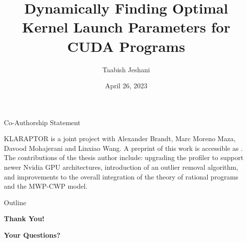 \documentclass[10pt]{beamer}
\title{\textbf{\Large{{Dynamically Finding Optimal Kernel Launch Parameters for CUDA Programs}}}}
\subtitle{}
\author[Jeshani]{
	{Taabish {Jeshani}}
}
\institute{
	\scriptsize
	{		{ORCCA, University of Western Ontario, Canada}\\
	}
}
\date[]
{
	\footnotesize
	April 26, 2023
}
\begin{document}

\begin{frame}
	\titlepage
\end{frame}

\begin{frame}{Co-Authorship Statement}
	\begin{block}{}
        KLARAPTOR is a joint project with Alexander Brandt, Marc Moreno Maza, Davood Mohajerani 
        and Linxiao Wang. A preprint of this work is accessible as \cite{DBLP:journals/corr/abs-1911-02373}. 
        The contributions of the thesis author include: upgrading the profiler to support newer Nvidia GPU architectures, 
        introduction of an outlier removal algorithm, and improvements to the overall integration of the 
        theory of rational programs and the MWP-CWP model.
	\end{block}
\end{frame}
\begin{frame}{Outline}
	\tableofcontents
\end{frame}







\setcounter{finalframe}{\value{framenumber}}


\begin{frame}
\begin{center}
	{\huge{\textbf{Thank You!}}}
\end{center}
\end{frame}
\begin{frame}
\begin{center}
{\huge{\textbf {Your Questions?}}}
\end{center}
\end{frame}
{}


%
\end{document}
